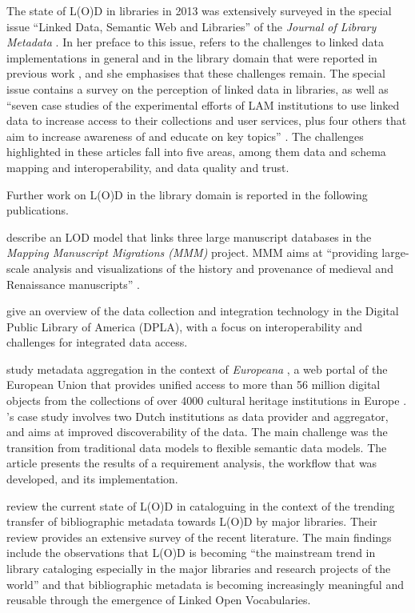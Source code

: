 The state of L(O)D in libraries in 2013 was extensively surveyed in the special issue
\enquote{Linked Data, Semantic Web and Libraries} of the \emph{Journal of Library Metadata} \autocite{JLM13_2-3}.
In her preface to this issue, \textcite{Bair2013} refers to the challenges to linked data implementations
in general and in the library domain that were reported in previous work
\autocite{Bizer2009,Byrne2010,Gonzalez2011,Alemu2012},
and she emphasises that these challenges remain.
The special issue contains a survey on the perception of linked data in libraries,
as well as
\enquote{seven case studies of the experimental efforts of LAM institutions to use linked data to increase access to their collections and user services, plus four others that aim to increase awareness of and educate on key topics} \autocite[p.76]{Bair2013}.
The challenges highlighted in these articles fall into five areas,
among them data and schema mapping and interoperability, and data quality and trust.

Further work on L(O)D in the library domain is reported in the following publications.

\textcite{Burrows2021} describe an LOD model that links
three large manuscript databases
in the \emph{Mapping Manuscript Migrations (MMM)} project.
MMM aims at \enquote{providing large-scale analysis and visualizations of the history and provenance of medieval and Renaissance manuscripts} \autocite[p.3]{Burrows2021}.

\textcite{LigiaTriques2022} give an overview of the data collection and integration technology
in the Digital Public Library of America (DPLA), with a focus on
interoperability and challenges for integrated data access.

\textcite{Freire2019} study metadata aggregation in the context of \emph{Europeana} \autocite{Isaac2012,Petras2017},
a web portal of the European Union that provides unified access to 
more than 56 million digital objects
from the collections of over 4000 cultural heritage institutions in Europe \autocite{Europeana}.
\citeauthor{Freire2019}'s case study involves two Dutch institutions as data provider and aggregator,
and aims at improved discoverability of the data.
The main challenge was the transition from traditional data models to flexible semantic data models.
The article presents the results of a requirement analysis,
the workflow that was developed, and its implementation.

\textcite{Ullah2018} review the current state of L(O)D in cataloguing
in the context of the trending transfer of bibliographic metadata
towards L(O)D by major libraries.
Their review provides an extensive survey of the recent literature.
The main findings include
the observations that L(O)D is becoming
\enquote{the mainstream trend in library cataloging especially in the major libraries and research projects of the world} \autocite[p.47]{Ullah2018}
and that bibliographic metadata is becoming increasingly meaningful and reusable through the emergence of Linked Open Vocabularies.

